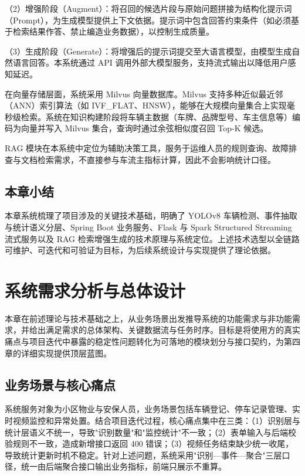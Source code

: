 \documentclass{wzuthesis} %
\begin{document}
（2）增强阶段（Augment）：将召回的候选片段与原始问题拼接为结构化提示词（Prompt），为生成模型提供上下文依据。提示词中包含回答约束条件（如必须基于检索结果作答、禁止编造业务数据），以控制生成质量。

（3）生成阶段（Generate）：将增强后的提示词提交至大语言模型，由模型生成自然语言回答。本系统通过 API 调用外部大模型服务，支持流式输出以降低用户感知延迟。

在向量存储层面，系统采用 Milvus 向量数据库。Milvus 支持多种近似最近邻（ANN）索引算法（如 IVF\_FLAT、HNSW），能够在大规模向量集合上实现毫秒级检索。系统在知识构建阶段将车辆主数据（车牌、品牌型号、车主信息等）编码为向量并写入 Milvus 集合，查询时通过余弦相似度召回 Top-K 候选。

RAG 模块在本系统中定位为辅助决策工具，服务于运维人员的规则查询、故障排查与文档检索需求，不直接参与车流主指标计算，因此不会影响统计口径。

\section{本章小结}

本章系统梳理了项目涉及的关键技术基础，明确了 YOLOv8 车辆检测、事件抽取与统计语义分层、Spring Boot 业务服务、Flask 与 Spark Structured Streaming 流式服务以及 RAG 检索增强生成的技术原理与系统定位。上述技术选型以全链路可维护、可迭代和可验证为目标，为后续系统设计与实现提供了理论依据。


\chapter{系统需求分析与总体设计}

本章在前述理论与技术基础之上，从业务场景出发推导系统的功能需求与非功能需求，并给出满足需求的总体架构、关键数据流与任务时序。目标是将使用方的真实痛点与项目迭代中暴露的稳定性问题转化为可落地的模块划分与接口契约，为第四章的详细实现提供顶层蓝图。

\section{业务场景与核心痛点}

系统服务对象为小区物业与安保人员，业务场景包括车辆登记、停车记录管理、实时视频监控和异常处置。结合项目迭代过程，核心痛点集中在三类：（1）识别层与统计层语义不统一，导致"识别数量"和"监控统计"不一致；（2）表单输入与后端校验规则不一致，造成新增接口返回 400 错误；（3）视频任务结束缺少统一收尾，导致统计更新时机不稳定。针对上述问题，系统采用"识别—事件—聚合"三层口径，统一由后端聚合接口输出业务指标，前端只展示不重算。
\end{document}

